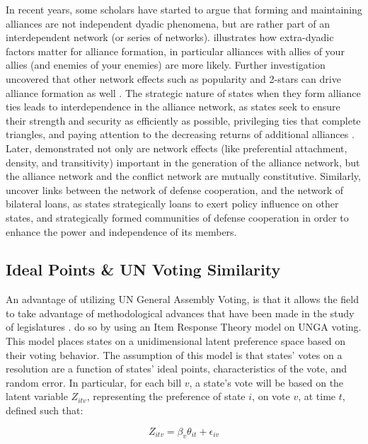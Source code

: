 In recent years, some scholars have started to argue that forming and maintaining alliances are not independent dyadic phenomena, but are rather part of an interdependent network (or series of networks). \citet{warren:2010} illustrates how extra-dyadic factors matter for alliance formation, in particular alliances with allies of your allies (and enemies of your enemies) are more likely. Further investigation uncovered that other network effects such as popularity and 2-stars can drive alliance formation as well \citep{cranmer:etal:2015}. The strategic nature of states when they form alliance ties leads to interdependence in the alliance network, as states seek to ensure their strength and security as efficiently as possible, privileging ties that complete triangles, and paying attention to the decreasing returns of additional alliances \citep{cranmer:etal:2012}. Later, \citet{warren:2016} demonstrated not only are network effects (like preferential attachment, density, and transitivity) important in the generation of the alliance network, but the alliance network and the conflict network are mutually constitutive. Similarly, \citet{kinne:bunte:2018} uncover links between the network of defense cooperation, and the network of bilateral loans, as states strategically loans to exert policy influence on other states, and strategically formed communities of defense cooperation in order to enhance the power and independence of its members. 

\subsection*{Ideal Points \& UN Voting Similarity}

An advantage of utilizing UN General Assembly Voting, is that it allows the field to take advantage of methodological advances that have been made in the study of legislatures \citep{poole:rosenthal:1985}. \citet{bailey:etal:2015} do so by using an Item Response Theory model on UNGA voting. This model places states on a unidimensional latent preference space based on their voting behavior. The assumption of this model is that states' votes on a resolution are a function of states' ideal points, characteristics of the vote, and random error. In particular, for each bill $v$, a state's vote will be based on the latent variable $Z_{itv}$, representing the preference of state $i$, on vote $v$, at time $t$, defined such that:

\begin{equation}
	Z_{itv} = \beta_{v}\theta_{it} + \epsilon_{iv}
\end{equation}

